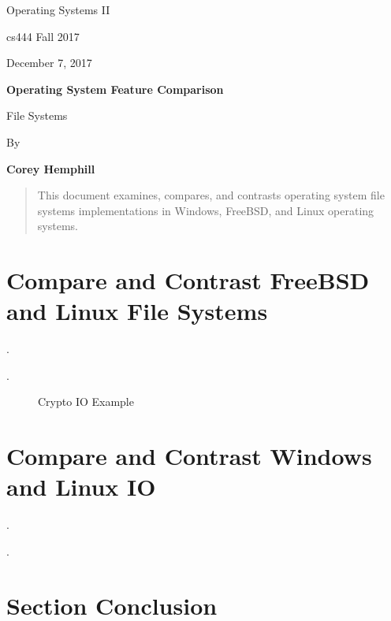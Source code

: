 \documentclass[letterpaper,10pt,draftclsnofoot,onecolumn]{IEEEtran}
\def \Author{Corey Hemphill}
\def \Title{Operating System Feature Comparison}
\def \Subtitle{File Systems}
\def \Term{cs444 Fall 2017}
\def \DueDate{December 7, 2017}
\def \DocType{
	Operating Systems II
}
\begin{document}
\begin{titlepage}
    \begin{singlespace}
        \hfill  
        \par\vspace{.2in}
        \centering
        \scshape {
            \huge  \DocType \par
           	\huge \Term \par
            {\large \DueDate}\par
            \vspace{.5in}
            \textbf{\Huge \Title}\par
            {\large \Subtitle}\par
            \vspace{.5in}          
            {\large By }\par
           	\textbf{\Author}\par
            \vspace{5pt}
            }
            \vspace{120pt}
        
        \begin{abstract}
        This document examines, compares, and contrasts operating system file systems implementations in Windows, FreeBSD, and Linux operating systems.
        \end{abstract}
        
    \end{singlespace}
\end{titlepage}
\newpage

\section{Compare and Contrast FreeBSD and Linux File Systems}
\noindent  


\cite{FreeBSD1IO} \cite{FreeBSD2IO} \cite{FreeBSD3IO}.\\

\noindent 





\cite{Linux1IO} \cite{Linux2IO}.\\

\begin{figure}[H]
    \centering
    
    \caption{Crypto IO Example}
    \label{fig:crypto_io_ex}
\end{figure}

\section{Compare and Contrast Windows and Linux IO}
\noindent 




\cite{MSWindows1IO} \cite{MSWindows2IO} \cite{MSWindows3IO} \cite{MSWindows4IO}.\\

\noindent 



\cite{Linux1IO} \cite{Linux2IO}.\\

\section{Section Conclusion}
\noindent 

\newpage


\end{document}
